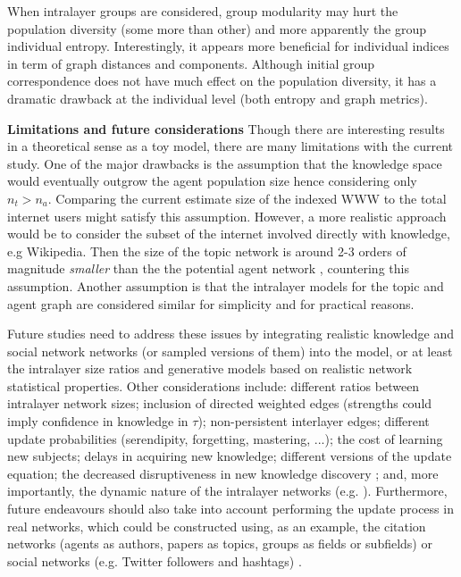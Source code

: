 \documentclass{svproc}
\begin{document}
When intralayer groups are considered,
    group modularity may hurt the population diversity (some more than other)
    and more apparently the group individual entropy.
Interestingly, it appears more beneficial for individual indices in term of graph distances and components.
Although initial group correspondence
    does not have much effect on the population diversity,
    it has a dramatic drawback at the individual level (both entropy and graph metrics).




\textbf{Limitations and future considerations}
Though there are interesting results in a theoretical sense as a toy model, there are many limitations with the current study.
    One of the major drawbacks is the assumption that the knowledge space would eventually outgrow the agent population size hence considering only $n_t > n_a$.
    Comparing the current estimate size of the indexed WWW \footnotemark[1] to the total internet users \footnotemark[2] might satisfy this assumption.
    However, a more realistic approach would be to consider the subset of the internet involved directly with knowledge, e.g Wikipedia. Then the size of the topic network \footnotemark[3] is around 2-3 orders of magnitude \textit{smaller} than the the potential agent network \footnotemark[2], countering this assumption.
Another assumption is that the intralayer models for the topic and agent graph are considered similar for simplicity and for practical reasons.

Future studies need to address these issues
    by integrating realistic knowledge and social network networks (or sampled versions of them) into the model,
    or at least the intralayer size ratios and generative models based on realistic network statistical properties.
Other considerations include:
    different ratios between intralayer network sizes;
    inclusion of directed weighted edges (strengths could imply confidence in knowledge in $\tau$);
    non-persistent interlayer edges;
    different update probabilities (serendipity, forgetting, mastering, ...);
    the cost of learning new subjects;
    delays in acquiring new knowledge;
    different versions of the update equation;
    the decreased disruptiveness in new knowledge discovery \cite{Park2021-jb};
    and, more importantly, the dynamic nature of the intralayer networks (e.g. \cite{Sun2020-qj}).
Furthermore, future endeavours should also take into account performing the update process in real networks,
    which could be constructed using, as an example, the citation networks (agents as authors, papers as topics, groups as fields or subfields) or social networks (e.g. Twitter followers and hashtags) \cite{Weng2015-zt}.
\end{document}
